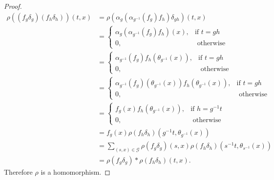 \documentclass[11pt, a4paper]{amsart}
\newcommand{\G}{\ensuremath {\mathcal{G}}}
\theoremstyle{plain}
\begin{document}
\begin{proof}
\begin{align*}
\rho((f_g\delta_g)(f_h\delta_h))(t,x) & = \rho(\alpha_g(\alpha_{g^{-1}}(f_g)f_h)\delta_{gh})(t,x) \\
                                      & = \left\lbrace\begin{array}{cl}
                                               \alpha_g(\alpha_{g^{-1}}(f_g)f_h)(x),  & \mbox{if} \,\, t=gh \\
                                               0, & \,\,  \mbox{otherwise}
                                           \end{array}  \right. \\
                                      & = \left\lbrace\begin{array}{cl}
                                               \alpha_{g^{-1}}(f_g)f_h(\theta_{g^{-1}}(x)),  & \mbox{if} \,\, t=gh \\
                                               0, & \,\,  \mbox{otherwise}
                                           \end{array}  \right. \\
                                      & = \left\lbrace\begin{array}{cl}
                                              \alpha_{g^{-1}}(f_g)(\theta_{g^{-1}}(x))f_h(\theta_{g^{-1}}(x)), & \mbox{if}\,\, t=gh \\
                                              0, & \,\,  \mbox{otherwise}
                                          \end{array}  \right. \\
                                      & = \left\lbrace\begin{array}{cl}
                                               f_g(x)f_h(\theta_{g^{-1}}(x)), & \mbox{if} \,\, h=g^{-1}t \\
                                               0, & \,\,  \mbox{otherwise}                                               
                                           \end{array}  \right. \\ 
                                      & = f_g(x)\rho(f_h \delta_h)(g^{-1}t, \theta_{g^{-1}}(x)) \\
                                      & = \sum_{(s,x) \in \G}\rho(f_g\delta_g)(s,x)\rho(f_h\delta_h)(s^{-1}t,\theta_{s^{-1}}(x))\\
                                      & = \rho(f_g\delta_g)* \rho(f_h\delta_h)(t,x).                                                                                         
\end{align*}
Therefore $\rho$ is a homomorphism.


\end{proof}
\end{document}
